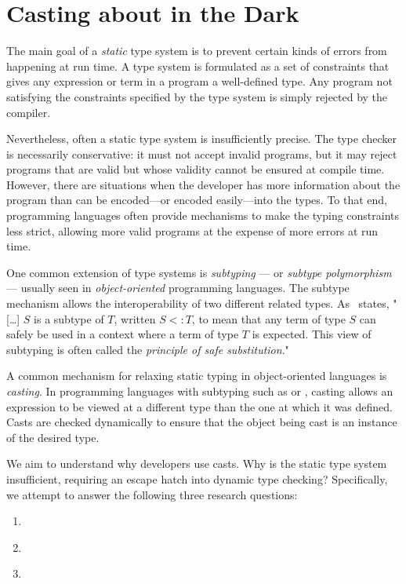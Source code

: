 


\chapter{Casting about in the Dark}
\label{cha:casts}

The main goal of a \emph{static} type system
is to prevent certain kinds of errors from happening at run time.
A type system is formulated as a set of constraints that gives any expression or term in a program a well-defined type.
Any program not satisfying the constraints specified by the type system is
simply rejected by the compiler.

Nevertheless, often a static type system is insufficiently precise.
The type checker is necessarily conservative:
it must not accept invalid programs,
but it may reject programs that are valid but whose validity cannot be ensured at compile time.
However, there are situations when the developer has more information
about the program than can be encoded---or encoded easily---into the types.
To that end, programming languages often provide mechanisms to make the typing constraints less strict,
allowing more valid programs at the expense of more errors at run time.

One common extension of type systems is \emph{subtyping} --- or \emph{subtype polymorphism} --- usually seen in \emph{object-oriented} programming languages.
The subtype mechanism allows the interoperability of two different related types.
As~\cite{pierceTypesProgrammingLanguages2002} states, "[\ldots] $S$ is a subtype of $T$, written $S <: T$, to mean that any term of type $S$ can safely be used in a context where a term of type $T$ is expected.
This view of subtyping is often called the \emph{principle of safe substitution}."

A common mechanism for relaxing static typing in object-oriented languages is \emph{casting}.
In programming languages with subtyping such as \java{} or \cpp{}, casting
allows
an expression to be viewed at a different type than the one at which it was defined.
Casts are checked dynamically to ensure that the object
being cast is an instance of the desired type.

We aim to understand why developers use casts.
Why is the static type system insufficient,
requiring an escape hatch into dynamic type checking?
Specifically, we attempt to answer the following three research questions:

\begin{enumerate}[label=$RQ/C\arabic*:$,ref=$RQ/C\arabic*$,leftmargin=3.4\parindent]
\item\label{casts:rq1}{\bf \crqA} \crqAdesc
\item\label{casts:rq2}{\bf \crqB} \crqBdesc
\item\label{casts:rq3}{\bf \crqC} \crqCdesc
\end{enumerate}

